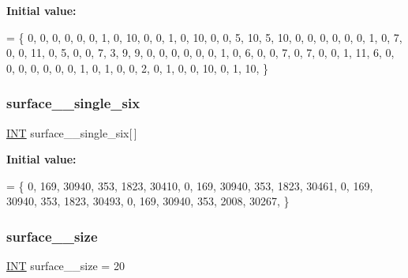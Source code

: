 {\bfseries Initial value\+:}
\begin{DoxyCode}
= \{
    0, 0, 0, 0, 0, 0, 1, 0, 10, 0, 0, 1, 0, 10, 0, 0, 5, 10, 5, 10, 
    0, 0, 0, 0, 0, 0, 1, 0, 7, 0, 0, 11, 0, 5, 0, 0, 7, 3, 9, 9, 
    0, 0, 0, 0, 0, 0, 1, 0, 6, 0, 0, 7, 0, 7, 0, 0, 1, 11, 6, 0, 
    0, 0, 0, 0, 0, 0, 1, 0, 1, 0, 0, 2, 0, 1, 0, 0, 10, 0, 1, 10, 
\}
\end{DoxyCode}
\mbox{\label{surface__13_8_c_a3696484a18cb791e08d2fb8d8cd6f73d}} 
\subsubsection{\texorpdfstring{surface\+\_\+\_\+single\+\_\+six}{surface\_13\_single\_six}}
{\footnotesize\ttfamily \mbox{\hyperlink{galois_8h_a09fddde158a3a20bd2dcadb609de11dc}{I\+NT}} surface\+\_\+\_\+single\+\_\+six\mbox{[}$\,$\mbox{]}}

{\bfseries Initial value\+:}
\begin{DoxyCode}
= \{ 
    0, 169, 30940, 353, 1823, 30410, 
    0, 169, 30940, 353, 1823, 30461, 
    0, 169, 30940, 353, 1823, 30493, 
    0, 169, 30940, 353, 2008, 30267, 
\}
\end{DoxyCode}
\mbox{\label{surface__13_8_c_a1e29bb83475a67c0c1b0673aa1104855}} 
\subsubsection{\texorpdfstring{surface\+\_\+\_\+size}{surface\_13\_size}}
{\footnotesize\ttfamily \mbox{\hyperlink{galois_8h_a09fddde158a3a20bd2dcadb609de11dc}{I\+NT}} surface\+\_\+\_\+size = 20}

\mbox{\label{surface__13_8_c_a019a1e7dba79917b935d858a9fbe87c0}} 
